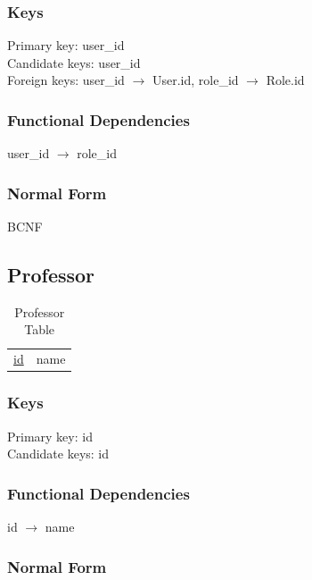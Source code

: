 \documentclass[11pt]{article}
\begin{document}
\subsubsection{Keys}
\label{sec-3-3-1}

    
    Primary key: user\_id\\
    Candidate keys: user\_id\\
    Foreign keys: user\_id $\rightarrow$ User.id, role\_id $\rightarrow$ Role.id
\subsubsection{Functional Dependencies}
\label{sec-3-3-2}


    user\_id $\rightarrow$ role\_id
    
\subsubsection{Normal Form}
\label{sec-3-3-3}


    BCNF
\subsection{Professor}
\label{sec-3-4}


\begin{table}[htb]
\caption{Professor Table} 
\begin{center}
\begin{tabular}{ll}
 \underline{id}  &  name  \\
\end{tabular}
\end{center}
\end{table}
\subsubsection{Keys}
\label{sec-3-4-1}

    
    Primary key: id\\
    Candidate keys: id
\subsubsection{Functional Dependencies}
\label{sec-3-4-2}


    id $\rightarrow$ name\\
\subsubsection{Normal Form}
\label{sec-3-4-3}
\end{document}
